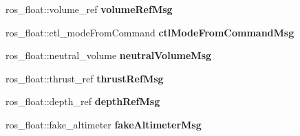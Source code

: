 \begin{DoxyCompactItemize}
\mbox{\label{classCOMMAND__reader_a4ad0a6dbed5b7fd071379771e6a6f4e7}} 
ros\+\_\+float\+::volume\+\_\+ref {\bfseries volume\+Ref\+Msg}
\item 
\mbox{\label{classCOMMAND__reader_a5b834059eb8fed6193ee571154ac56ac}} 
ros\+\_\+float\+::ctl\+\_\+mode\+From\+Command {\bfseries ctl\+Mode\+From\+Command\+Msg}
\item 
\mbox{\label{classCOMMAND__reader_a52bdc3a18b6e68ab269fad89714633a0}} 
ros\+\_\+float\+::neutral\+\_\+volume {\bfseries neutral\+Volume\+Msg}
\item 
\mbox{\label{classCOMMAND__reader_a53197806107330f5ed1debdb238c4e07}} 
ros\+\_\+float\+::thrust\+\_\+ref {\bfseries thrust\+Ref\+Msg}
\item 
\mbox{\label{classCOMMAND__reader_a1eec4eec1f2d57c803bc97ae12b47f7f}} 
ros\+\_\+float\+::depth\+\_\+ref {\bfseries depth\+Ref\+Msg}
\item 
\mbox{\label{classCOMMAND__reader_a86d2dab939525bfda3357bd75455e551}} 
ros\+\_\+float\+::fake\+\_\+altimeter {\bfseries fake\+Altimeter\+Msg}
\end{DoxyCompactItemize}

